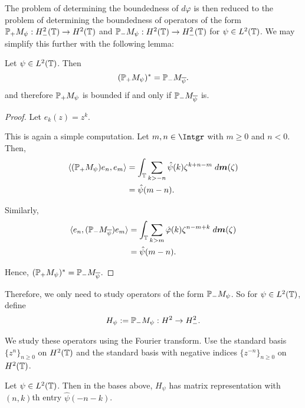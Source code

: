 \documentclass{unswmaths}
\begin{document}
The problem of determining the boundedness of $d\varphi$ is then reduced to the problem of determining
the boundedness of operators of the form $\mathbb{P}_+M_\psi:H^2_-(\mathbb{T})\rightarrow H^2(\mathbb{T})$ and $\mathbb{P}_-M_\psi:H^2(\mathbb{T})\rightarrow H^2_-(\mathbb{T})$ for $\psi \in L^2(\mathbb{T})$. We may simplify
this further with the following lemma:
\begin{lemma}
    Let $\psi \in L^2(\mathbb{T})$. Then
    \begin{equation*}
        (\mathbb{P}_+M_\psi)^* = \mathbb{P}_-M_{\overline{\psi}}.
    \end{equation*}
    and therefore $\mathbb{P}_+M_\psi$ is bounded if and only if $\mathbb{P}_-M_{\overline{\psi}}$ is.
\end{lemma}
\begin{proof}
    Let $e_k(z) = z^k$. 

    This is again a simple computation. Let $m,n\in \Intgr$ with $m \geq 0$ and $n < 0$. Then,
    \begin{align*}
        \langle (\mathbb{P}_+M_\psi)e_n,e_m\rangle &= \int_{\mathbb{T}}\sum_{k>-n} \hat{\psi}(k)\zeta^{k+n-m}\;d\boldsymbol{m}(\zeta)\\
        &= \hat{\psi}(m-n).
    \end{align*}
    
    Similarly,
    \begin{align*}
        \langle e_n, (\mathbb{P}_-M_{\overline{\psi}})e_m \rangle &= \int_{\mathbb{T}} \sum_{k > m} \hat{\varphi}(k) \zeta^{n-m+k}\;d\boldsymbol{m}(\zeta)\\
                                                &= \hat{\psi}(m-n).
    \end{align*}
    
    Hence, $(\mathbb{P}_+M_\psi)^* = \mathbb{P}_-M_{\overline{\psi}}$.

\end{proof}

Therefore, we only need to study operators of the form $\mathbb{P}_-M_\psi$. So for $\psi \in L^2(\mathbb{T})$, define
\begin{equation*}
    H_\psi := \mathbb{P}_-M_\psi:H^2\rightarrow H^2_-.
\end{equation*}

We study these operators using the Fourier transform. Use the standard basis $\{z^n\}_{n\geq 0}$
on $H^2(\mathbb{T})$ and the standard basis with negative indices $\{z^{-n}\}_{n \geq 0}$ on $H^2(\mathbb{T})$.

Let $\psi \in L^2(\mathbb{T})$. Then in the bases above, $H_\psi$ has matrix representation
with $(n,k)$th entry $\hat{\psi}(-n-k)$. 
\end{document}
